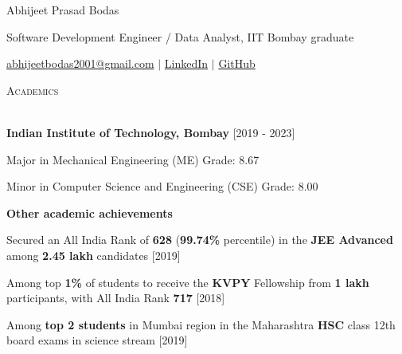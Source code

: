 \documentclass[10pt]{article}
\renewcommand{\section}[1]{
    \vspace*{5pt}
    \textsc{\Large{#1}}
    \vspace*{-8pt} \\ \hspace*{-5pt}
    \hrulefill \\
    \vspace*{-15pt}
    \vspace*{-5pt}
}
\newcommand{\smallbullet}{
    \small$\bullet$
}
\newenvironment{bullet-list-major}{
    \vspace*{8pt}
    \begin{list}{
        \smallbullet
    }{
        \setlength\leftmargin{15pt}\topsep -5pt \itemsep -6pt
    }
} {
    \end{list}
}
\begin{document}


    {\Large{\begin{center}Abhijeet Prasad Bodas\end{center}}}
    \vspace{-6pt}
    {\begin{center}Software Development Engineer / Data Analyst, IIT Bombay graduate\end{center}}
    \vspace{-6pt}
    {\begin{center}
        {\color{blue}\href{mailto:abhijeetbodas2001@gmail.com}{abhijeetbodas2001@gmail.com}} \(|\) {\color{blue}\href{https://www.linkedin.com/in/abhijeetbodas2001/}{LinkedIn}} \(|\) {\color{blue}\href{https://github.com/abhijeetbodas2001/}{GitHub}}
    \end{center}}


    \section{Academics}
    \hspace{-2pt}\textbf{Indian Institute of Technology, Bombay} \hfill [2019 - 2023] \hspace{-40pt}
    \vspace{10pt}
    \begin{bullet-list-major}
        \item Major in Mechanical Engineering (ME) \hfill Grade: 8.67
        \item Minor in Computer Science and Engineering (CSE) \hfill Grade: 8.00
    \end{bullet-list-major}
    \textbf{Other academic achievements}
    \vspace{-10pt}
    \begin{bullet-list-major}
        \item Secured an All India Rank of \textbf{628} (\textbf{99.74\%} percentile) in the \textbf{JEE Advanced} among \textbf{2.45 lakh} candidates \hfill [2019]
        \item Among top \textbf{1\%} of students to receive the \textbf{KVPY} Fellowship from \textbf{1 lakh} participants, with All India Rank \textbf{717}  \hfill [2018]
        \item Among \textbf{top 2 students} in Mumbai region in the Maharashtra \textbf{HSC} class 12th board exams in science stream   \hfill [2019]
    \end{bullet-list-major}
\end{document}

